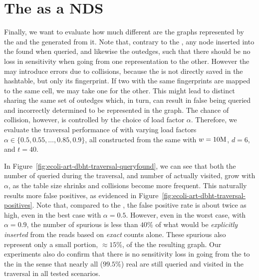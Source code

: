 \section{The \dBHT as a NDS}
\label{sec:results-dbht}

Finally, we want to evaluate how much different are the graphs represented by the \dBCM and the \dBHT generated from it. Note that, contrary to the \dBCM, any node inserted into the \dBHT found when queried, and likewise the outedges, such that there should be no loss in sensitivity when going from one representation to the other. However the \dBHT may introduce errors due to collisions, because the \kmer is not directly saved in the hashtable, but only its fingerprint. If two  with the same fingerprints are mapped to the same cell, we may take one for the other. This might lead to distinct  sharing the same set of outedges which, in turn, can result in false  being queried and incorrectly determined to be represented in the graph. The chance of collision, however, is controlled by the choice of load factor $\alpha$. Therefore, we evaluate the traversal performance of  with varying load factors $\alpha \in \{0.5, 0.55, \ldots, 0.85, 0.9\}$, all constructed from the same \dBCM with $w = 10\mega$, $d = 6$, and $t = 40$.

In Figure~\ref{fig:ecoli-art-dbht-traversal-queryfound}, we can see that both the number of  queried during the traversal, and number of  actually visited, grow with $\alpha$, as the table size shrinks and collisions become more frequent. This  naturally results more false positives, as evidenced in Figure~\ref{fig:ecoli-art-dbht-traversal-positives}. Note that, compared to the \dBCM, the false positive rate is about twice as high, even in the best case with $\alpha = 0.5$. However, even in the worst case, with $\alpha = 0.9$, the number of spurious  is less than $40\%$ of what would be \emph{explicitly inserted} from the reads based on \emph{exact} counts alone. These spurious  also represent only a small portion, $\approx 15\%$, of the the resulting graph. Our experiments also do confirm that there is no sensitivity loss in going from the \dBCM to the \dBHT in the sense that nearly all ($99.5\%$) real \kmers are still queried and visited in the traversal in all tested scenarios.

